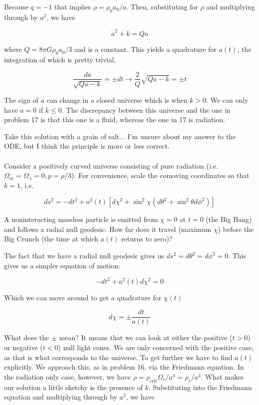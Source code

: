 \documentclass[11pt,largemargins]{homework}
\begin{document}
\begin{alphaparts}
Because $q = -1$ that implies $\rho = \rho_0 a_0 / a$. Then, substituting for $\rho$ and multiplying through by $a^2$, we have

$$\dot{a}^2 + k = Qa$$

where $Q = 8 \pi G \rho_0 a_0 / 3$ and is a constant.  This yields a quadrature for $a(t)$, the integration of which is pretty trivial.

$$ \frac{da}{\sqrt{Qa - k}} = \pm dt \to \frac{2}{Q}\sqrt{Qa - k} = \pm t$$

The sign of $\dot{a}$ can change in a closed universe which is when $k>0$.  We can only have $a=0$ if $k \leq 0$.  The discrepancy between this universe and the one in problem 17 is that this one is a fluid, whereas the one in 17 is radiation.
\end{alphaparts}

\question 
\color{red}
Take this solution with a grain of salt... I'm unsure about my answer to the ODE, but I think the principle is more or less correct. \\ \\
\color{black}
Consider a positively curved universe consisting of pure radiation (i.e. $\Omega_m = \Omega_\lambda = 0, p = \rho/3$). For convenience, scale the comoving coordinates so that $k = 1$, i.e.

$$ ds^2 = -dt^2 + a^2(t) [d\chi^2 + \sin^2 \chi (d\theta^2 + \sin^2 \theta d\phi^2)]$$

A noninteracting massless particle is emitted from $\chi = 0$ at $t = 0$ (the Big Bang) and follows a radial null geodesic.  How far does it travel (maximum $\chi$) before the Big Crunch (the time at which $a(t)$ returns to zero)?

The fact that we have a radial null geodesic gives us $ds^2 = d\theta^2 = d\phi^2 = 0$. This gives us a simpler equation of motion:

$$-dt^2 + a^2(t) d\chi^2 = 0$$

Which we can move around to get a quadrature for $\chi(t)$

$$d\chi = \pm \frac{dt}{a(t)}$$

What does the $\pm$ mean?  It means that we can look at either the positive ($t>0$) or negative ($t<0$) null light cones.  We are only concerned with the positive case, as that is what corresponds to the universe.  To get further we have to find $a(t)$ explicitly.  We approach this, as in problem 16, via the Friedmann equation.  In the radiation only case, however, we have $\rho = \rho_{\mathrm{crit}} \Omega_r / a^4 = \rho_r / a^4$.  What makes our solution a little sketchy is the presence of $k$.  Substituting into the Friedmann equation and multiplying through by $a^2$, we have 
\end{document}
